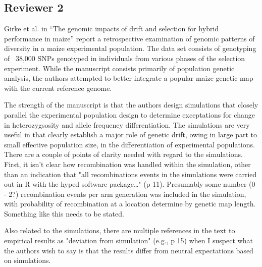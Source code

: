 \documentclass[onecolumn,oneside,letterpaper]{article}
\begin{document}

\subsection{Reviewer 2}
Girke et al. in ``The genomic impacts of drift and selection for hybrid performance in maize'' report a retrospective examination of genomic patterns of diversity in a maize experimental population. The data set consists of genotyping of ~38,000 SNPs genotyped in individuals from various phases of the selection experiment. While the manuscript consists primarily of population genetic analysis, the authors attempted 
to better integrate a popular maize genetic map with the current reference genome.

The strength of the manuscript is that the authors design simulations that closely parallel the experimental 
population design to determine exceptations for change in heterozygsosity and allele frequency 
differentiation. The simulations are very useful in that clearly establish a major role of genetic drift, owing 
in large part to small effective population size, in the differentiation of experimental populations. There are 
a couple of points of clarity needed with regard to the simulations. First, it isn't clear how recombination 
was handled within the simulation, other than an indication that "all recombinations events in the 
simulations were carried out in R with the hyped software package…" (p 11). Presumably some number (0 - 
2?) recombination events per arm generation was included in the simulation, with probability of 
recombination at a location determine by genetic map length. Something like this needs to be stated. 


Also related to the simulations, there are multiple references in the text to empirical results as "deviation from 
simulation" (e.g., p 15) when I suspect what the authors wish to say is that the results differ from neutral 
expectations based on simulations.

\end{document}
